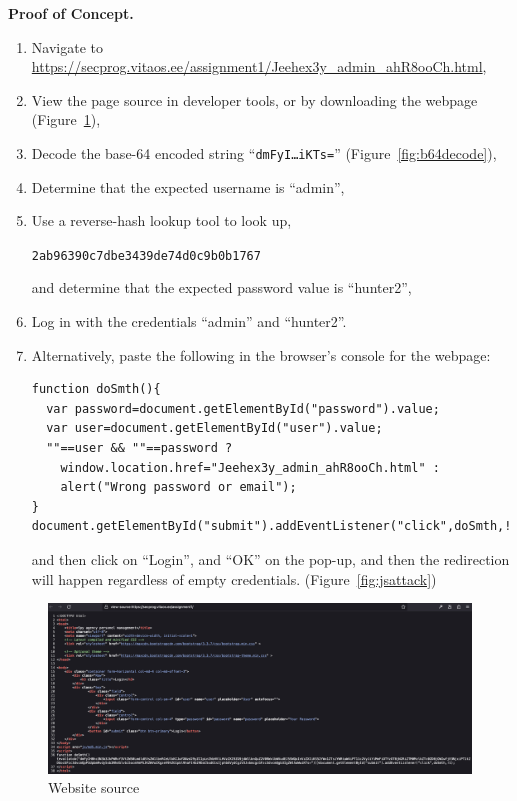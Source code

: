 \documentclass[parskip=half]{scrartcl}
\newcommand{\figref}[1]{Figure~\ref{#1}}
\begin{document}
\textbf{Proof of Concept.}

\begin{enumerate}
  \item Navigate to\\
  \url{https://secprog.vitaos.ee/assignment1/Jeehex3y_admin_ahR8ooCh.html},
  \item View the page source in developer tools, or by downloading the webpage
  (\figref{fig:sourcecode}),
  \item Decode the base-64 encoded string ``\texttt{dmFyI\dots iKTs=}''
  (\figref{fig:b64decode}),
  \item Determine that the expected username is ``admin'',
  \item Use a reverse-hash lookup tool to look up,
\begin{center}
  \texttt{2ab96390c7dbe3439de74d0c9b0b1767}
\end{center}
  and determine that the expected password value is ``hunter2''\footnotemark,
  \item Log in with the credentials ``admin'' and ``hunter2''.
  \item Alternatively, paste the following in the browser's console for the
  webpage:
\begin{verbatim}
function doSmth(){
  var password=document.getElementById("password").value;
  var user=document.getElementById("user").value;
  ""==user && ""==password ?
    window.location.href="Jeehex3y_admin_ahR8ooCh.html" :
    alert("Wrong password or email");
}
document.getElementById("submit").addEventListener("click",doSmth,!1);
\end{verbatim}
  and then click on ``Login'', and ``OK'' on the pop-up, and then the
  redirection will happen regardless of empty credentials.
  (\figref{fig:jsattack})
\end{enumerate}

\begin{figure}
  \centering
  \includegraphics[width=\textwidth]{sourcecode}
  \caption{Website source}
  \label{fig:sourcecode}
\end{figure}
\end{document}
